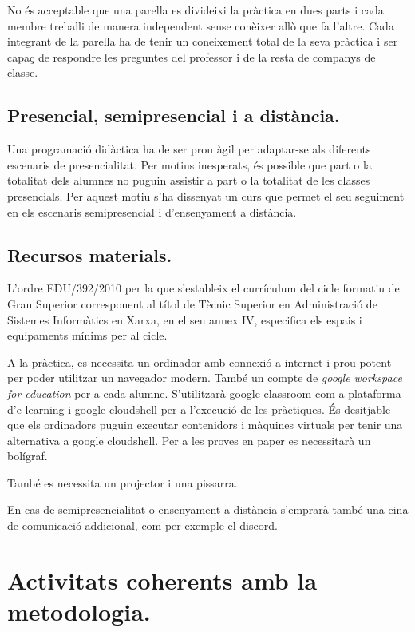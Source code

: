 \documentclass[catalan, a4paper, 12pt, titlepage]{article}
\begin{document}
No és acceptable que una parella es divideixi la pràctica en dues parts i cada membre treballi de manera independent sense conèixer allò que fa l'altre. 
Cada integrant de la parella ha de tenir un coneixement total de la seva pràctica i ser capaç de respondre les preguntes del professor i de la resta de companys de classe.

\subsection{Presencial, semipresencial i a distància.}

Una programació didàctica ha de ser prou àgil per adaptar-se als diferents escenaris de presencialitat.
Per motius inesperats, és possible que part o la totalitat dels alumnes no puguin assistir a part o la totalitat de les classes presencials.
Per aquest motiu s'ha dissenyat un curs que permet el seu seguiment en els escenaris semipresencial i d'ensenyament a distància.

\subsection{Recursos materials.}

L'ordre EDU/392/2010 per la que s'estableix el currículum del cicle formatiu de Grau Superior corresponent al títol de Tècnic Superior en Administració de Sistemes Informàtics en Xarxa, en el seu annex IV, especifica els espais i equipaments mínims per al cicle.

A la pràctica, es necessita un ordinador amb connexió a internet i prou potent per poder utilitzar un navegador modern. També un compte de \emph{google workspace for education} per a cada alumne. S'utilitzarà google classroom com a plataforma d'e-learning i google cloudshell per a l'execució de les pràctiques. És desitjable que els ordinadors puguin executar contenidors i màquines virtuals per tenir una alternativa a google cloudshell. Per a les proves en paper es necessitarà un bolígraf.

També es necessita un projector i una pissarra.

En cas de semipresencialitat o ensenyament a distància s'emprarà també una eina de comunicació addicional, com per exemple el discord.

\section{Activitats coherents amb la metodologia.}
\label{sec:activitats_coherents}
\end{document}
